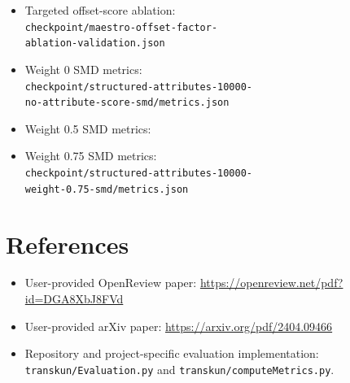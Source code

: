 \documentclass[11pt]{article}
\begin{document}
\begin{itemize}
  \item Targeted offset-score ablation:
        \\
        \texttt{checkpoint/maestro-offset-factor-}\\
        \texttt{ablation-validation.json}
  \item Weight 0 SMD metrics:
        \\
        \texttt{checkpoint/structured-attributes-10000-}\\
        \texttt{no-attribute-score-smd/metrics.json}
  \item Weight 0.5 SMD metrics:
  \item Weight 0.75 SMD metrics:
        \\
        \texttt{checkpoint/structured-attributes-10000-}\\
        \texttt{weight-0.75-smd/metrics.json}
\end{itemize}

\section{References}

\begin{itemize}
  \item User-provided OpenReview paper:
        \url{https://openreview.net/pdf?id=DGA8XbJ8FVd}
  \item User-provided arXiv paper:
        \url{https://arxiv.org/pdf/2404.09466}
  \item Repository and project-specific evaluation implementation:
        \texttt{transkun/Evaluation.py} and
        \texttt{transkun/computeMetrics.py}.
\end{itemize}
\end{document}
